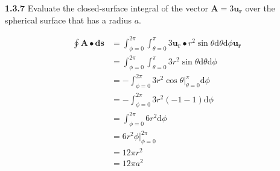 \documentclass{article}
\begin{document}
\textbf{1.3.7} Evaluate the closed-surface integral of the vector $\mathbf{A} = 3\mathbf{u_r}$ over the spherical
surface that has a radius $a$.

\begin{equation*}
	\begin{split}
		\oint \mathbf{A} \bullet \mathbf{ds} & = \int_{\phi = 0}^{2\pi} \int_{\theta = 0}^\pi 3\mathbf{u_r} \bullet r^2 \sin{\theta} \text{d}\theta \text{d}\phi\mathbf{u_r} \\
		& = \int_{\phi = 0}^{2\pi} \int_{\theta = 0}^\pi 3r^2 \sin{\theta} \text{d}\theta \text{d}\phi \\
		& = -\int_{\phi = 0}^{2\pi} 3r^2 \cos{\theta} \big\rvert_{\theta=0}^\pi \text{d}\phi \\
		& = -\int_{\phi = 0}^{2\pi} 3r^2 (-1 - 1) \text{d}\phi \\
		& = \int_{\phi = 0}^{2\pi} 6r^2 \text{d}\phi \\
		& = 6r^2\phi\big\rvert_{\phi=0}^{2\pi} \\
		& = 12 \pi r^2 \\
		& = 12 \pi a^2
	\end{split}
\end{equation*}
\end{document}
